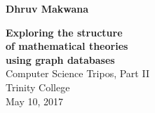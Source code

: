 \pagestyle{empty}

\hfill{\Large \sffamily \bfseries Dhruv Makwana}

\vspace*{60mm}
\begin{center}
\Huge
{\sf \bfseries Exploring the structure \\ of mathematical theories \\ using graph databases} \\
\vspace*{5mm}
Computer Science Tripos, Part II \\
\vspace*{5mm}
Trinity College \\
\vspace*{5mm}
May 10, 2017
\end{center}
